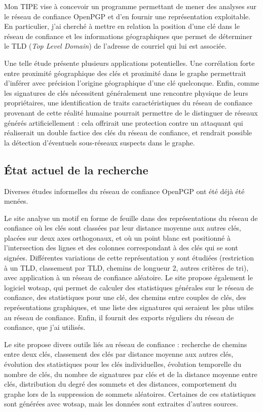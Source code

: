 \documentclass[a4paper]{article}
\begin{document}
Mon TIPE vise à concevoir un programme permettant de mener des analyses sur le réseau de confiance OpenPGP et d'en fournir une représentation exploitable. En particulier, j'ai cherché à mettre en relation la position d'une clé dans le réseau de confiance et les informations géographiques que permet de déterminer le TLD (\emph{Top Level Domain}) de l'adresse de courriel qui lui est associée.

Une telle étude présente plusieurs applications potentielles. Une corrélation forte entre proximité géographique des clés et proximité dans le graphe permettrait d'inférer avec précision l'origine géographique d'une clé quelconque. Enfin, comme les signatures de clés nécessitent généralement une rencontre physique de leurs propriétaires, une identification de traits caractéristiques du réseau de confiance provenant de cette réalité humaine pourrait permettre de le distinguer de réseaux générés artificiellement : cela offrirait une protection contre un attaquant qui réaliserait un double factice des clés du réseau de confiance, et rendrait possible la détection d'éventuels sous-réseaux suspects dans le graphe.

\subsection{État actuel de la recherche}

Diverses études informelles du réseau de confiance OpenPGP ont été déjà été menées.

Le site \cite{W1} analyse un motif en forme de feuille dans des représentations du réseau de confiance où les clés sont classées par leur distance moyenne aux autres clés, placées sur deux axes orthogonaux, et où un point blanc est positionné à l'intersection des lignes et des colonnes correspondant à des clés qui se sont signées. Différentes variations de cette représentation y sont étudiées (restriction à un TLD, classement par TLD, chemins de longueur 2, autres critères de tri), avec application à un réseau de confiance aléatoire. Le site propose également le logiciel wotsap, qui permet de calculer des statistiques générales sur le réseau de confiance, des statistiques pour une clé, des chemins entre couples de clés, des représentations graphiques, et une liste des signatures qui seraient les plus utiles au réseau de confiance. Enfin, il fournit des exports réguliers du réseau de confiance, que j'ai utilisés.

Le site \cite{W2} propose divers outils liés au réseau de confiance : recherche de chemins entre deux clés, classement des clés par distance moyenne aux autres clés, évolution des statistiques pour les clés individuelles, évolution temporelle du nombre de clés, du nombre de signatures par clés et de la distance moyenne entre clés, distribution du degré des sommets et des distances, comportement du graphe lors de la suppression de sommets aléatoires. Certaines de ces statistiques sont générées avec wotsap, mais les données sont extraites d'autres sources. 
\end{document}
